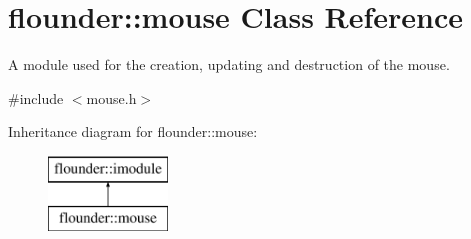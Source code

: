 \hypertarget{classflounder_1_1mouse}{}\section{flounder\+:\+:mouse Class Reference}
\label{classflounder_1_1mouse}


A module used for the creation, updating and destruction of the mouse.  




{\ttfamily \#include $<$mouse.\+h$>$}

Inheritance diagram for flounder\+:\+:mouse\+:\begin{figure}[H]
\begin{center}
\leavevmode
\includegraphics[height=2.000000cm]{classflounder_1_1mouse}
\end{center}
\end{figure}
